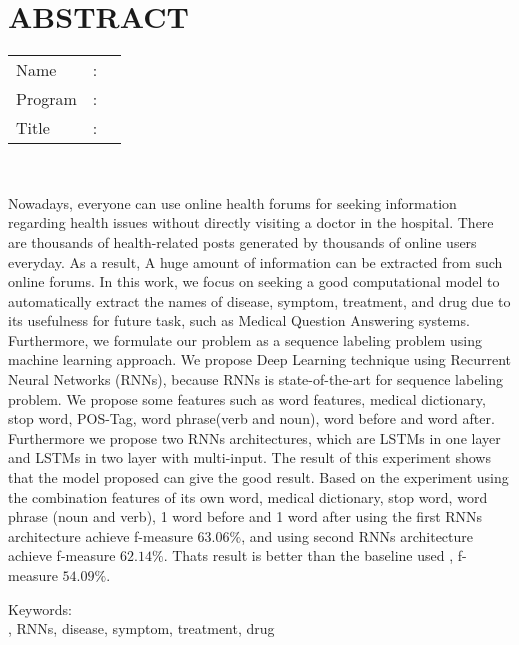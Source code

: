 %
%
%

\chapter*{ABSTRACT}

\vspace*{0.2cm}

\noindent \begin{tabular}{l l p{11.0cm}}
	Name&: & \penulis \\
	Program&: & \programEng \\
	Title&: & \judulInggris \\
\end{tabular} \\ 

\vspace*{0.5cm}

\noindent 

Nowadays, everyone can use online health forums for seeking information regarding health issues without directly visiting a doctor in the hospital. There are thousands of health-related posts generated by thousands of online users everyday. As a result, A huge amount of information can be extracted from such online forums. In this work, we focus on seeking a good computational model to automatically extract the names of disease, symptom, treatment, and drug due to its usefulness for future task, such as Medical Question Answering systems. Furthermore, we formulate our problem as a sequence labeling problem using machine learning approach. We propose Deep Learning technique using Recurrent Neural Networks (RNNs), because RNNs is state-of-the-art for sequence labeling problem. We propose some features such as word features, medical dictionary, stop word, POS-Tag, word phrase(verb and noun), word before and word after. Furthermore we propose two RNNs architectures, which are LSTMs in one layer and LSTMs in two layer with multi-input. The result of this experiment shows that the model proposed can give the good result. Based on the experiment using the combination features of its own word, medical dictionary, stop word, word phrase (noun and verb), 1 word before and 1 word after using the first RNNs architecture achieve f-measure $ 63.06\% $, and using second RNNs architecture achieve f-measure $ 62.14\% $. Thats result is better than the baseline used \citep{skripsiKakRadit}, f-measure $ 54.09\% $.


\vspace*{0.2cm}

\noindent Keywords: \\ 
\noindent \mer, RNNs, disease, symptom, treatment, drug \\ 

\newpage